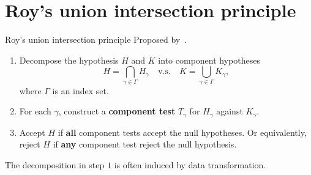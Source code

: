 \documentclass{beamer}
\theoremstyle{plain}
\theoremstyle{definition}
\theoremstyle{remark}
\begin{document}

\section{Roy's union intersection principle}
\begin{frame}{Roy's union intersection principle}
    Proposed by~\cite{Roy1953}.
    \begin{enumerate}
        \item
            Decompose the hypothesis $H$ and $K$ into component hypotheses
$$
            H=\bigcap_{\gamma\in\Gamma} H_\gamma \quad \text{v.s.} \quad K=\bigcup_{\gamma\in \Gamma} K_\gamma,
$$
where $\Gamma$ is an index set.
        \item
            For each $\gamma$, construct a \textbf{component test} $T_{\gamma}$ for $H_\gamma$ against $K_\gamma$.
        \item
            Accept $H$ if \textbf{all} component tests accept the null hypotheses. Or equivalently, reject $H$ if \textbf{any} component test reject the null hypothesis. 
    \end{enumerate}

    The decomposition in step $1$ is often induced by data transformation.
\end{frame}
\end{document}
